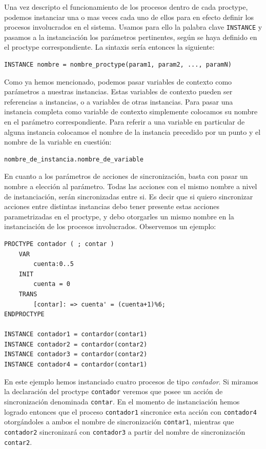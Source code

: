 \documentclass[titlepage, 12pt]{book}
\begin{document}
Una vez descripto el funcionamiento de los procesos dentro de cada proctype, podemos instanciar una o mas veces cada uno de ellos para en efecto definir los procesos involucrados en el sistema. Usamos para ello la palabra clave \texttt{INSTANCE} y pasamos a la instanciaci\'on los par\'ametros pertinentes, seg\'un se haya definido en el proctype correspondiente. La sintaxis ser\'ia entonces la siguiente: 
\begin{verbatim}
INSTANCE nombre = nombre_proctype(param1, param2, ..., paramN)
\end{verbatim}
Como ya hemos mencionado, podemos pasar variables de contexto como par\'ametros a nuestras instancias. Estas variables de contexto pueden ser referencias a instancias, o a variables de otras instancias. Para pasar una instancia completa como variable de contexto simplemente colocamos su nombre en el par\'ametro correspondiente. Para referir a una variable en particular de alguna instancia colocamos el nombre de la instancia precedido por un punto y el nombre de la variable en cuesti\'on:
\begin{verbatim}
nombre_de_instancia.nombre_de_variable
\end{verbatim}

En cuanto a los par\'ametros de acciones de sincronizaci\'on, basta con pasar un nombre a elecci\'on al par\'ametro. Todas las acciones con el mismo nombre a nivel de instanciaci\'on, ser\'an sincronizadas entre si. Es decir que si quiero sincronizar acciones entre distintas instancias debo tener presente estas acciones parametrizadas en el proctype, y debo otorgarles un mismo nombre en la instanciaci\'on de los procesos involucrados. Observemos un ejemplo:
\begin{verbatim}
PROCTYPE contador ( ; contar )
    VAR
        cuenta:0..5
    INIT
        cuenta = 0
    TRANS
        [contar]: => cuenta' = (cuenta+1)%6;
ENDPROCTYPE

INSTANCE contador1 = contardor(contar1)
INSTANCE contador2 = contardor(contar2)
INSTANCE contador3 = contardor(contar2)
INSTANCE contador4 = contardor(contar1)
\end{verbatim}

En este ejemplo hemos instanciado cuatro procesos de tipo \textit{contador}. Si miramos la declaraci\'on del proctype \texttt{contador} veremos que posee un acci\'on de sincronizaci\'on denominada \texttt{contar}. En el momento de instanciaci\'on hemos logrado entonces que el proceso \texttt{contador1} sincronice esta acci\'on con \texttt{contador4} otorg\'andoles a ambos el nombre de sincronizaci\'on \texttt{contar1}, mientras que \texttt{contador2} sincronizar\'a con \texttt{contador3} a partir del nombre de sincronizaci\'on \texttt{contar2}.
\end{document}
